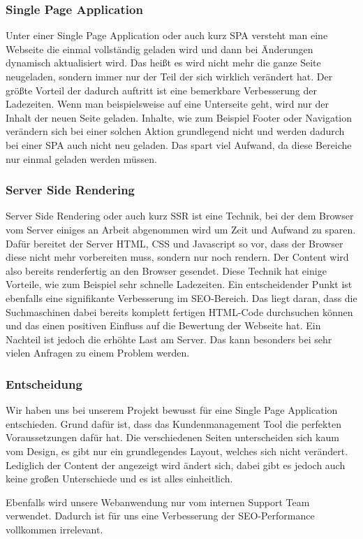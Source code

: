 \subsubsection{Single Page Application}
Unter einer Single Page Application oder auch kurz SPA versteht man eine Webseite die einmal vollständig geladen wird und dann bei Änderungen dynamisch aktualisiert wird. Das heißt es wird nicht mehr die ganze Seite neugeladen, sondern immer nur der Teil der sich wirklich verändert hat. Der größte Vorteil der dadurch auftritt ist eine bemerkbare Verbesserung der Ladezeiten. Wenn man beispielsweise auf eine Unterseite geht, wird nur der Inhalt der neuen Seite geladen. Inhalte, wie zum Beispiel Footer oder Navigation verändern sich bei einer solchen Aktion grundlegend nicht und werden dadurch bei einer SPA auch nicht neu geladen. Das spart viel Aufwand, da diese Bereiche nur einmal geladen werden müssen.
\cite{frontend_spa}

\subsubsection{Server Side Rendering}
Server Side Rendering oder auch kurz SSR ist eine Technik, bei der dem Browser vom Server einiges an Arbeit abgenommen wird um Zeit und Aufwand zu sparen. Dafür bereitet der Server HTML, CSS und Javascript so vor, dass der Browser diese nicht mehr vorbereiten muss, sondern nur noch rendern. Der Content wird also bereits renderfertig an den Browser gesendet.
Diese Technik hat einige Vorteile, wie zum Beispiel sehr schnelle Ladezeiten. Ein entscheidender Punkt ist ebenfalls eine signifikante Verbesserung im SEO-Bereich. Das liegt daran, dass die Suchmaschinen dabei bereits komplett fertigen HTML-Code durchsuchen können und das einen positiven Einfluss auf die Bewertung der Webseite hat. 
Ein Nachteil ist jedoch die erhöhte Last am Server. Das kann besonders bei sehr vielen Anfragen zu einem Problem werden.
\cite{frontend_ssr}

\subsubsection{Entscheidung}
Wir haben uns bei unserem Projekt bewusst für eine Single Page Application entschieden. Grund dafür ist, dass das Kundenmanagement Tool die perfekten Voraussetzungen dafür hat. Die verschiedenen Seiten unterscheiden sich kaum vom Design, es gibt nur ein grundlegendes Layout, welches sich nicht verändert. Lediglich der Content der angezeigt wird ändert sich, dabei gibt es jedoch auch keine großen Unterschiede und es ist alles einheitlich.

Ebenfalls wird unsere Webanwendung nur vom internen Support Team verwendet. Dadurch ist für uns eine Verbesserung der SEO-Performance vollkommen irrelevant.